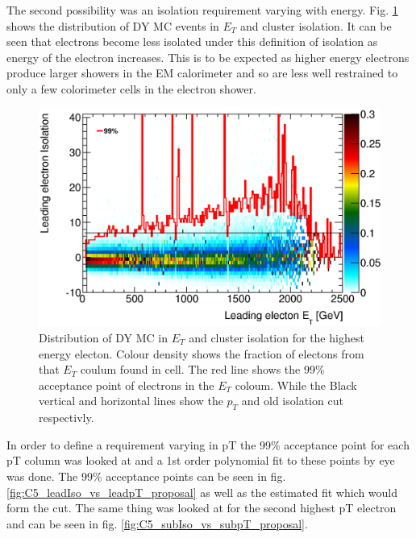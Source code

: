 The second possibility was an isolation requirement varying with energy. Fig. \ref{fig:C5_leadIso_vs_leadpT} shows the distribution of DY MC events in $E_{T}$ and cluster isolation. It can be seen that electrons become less isolated under this definition of isolation as energy of the electron increases. This is to be expected as higher energy electrons produce larger showers in the EM calorimeter and so are less well restrained to only a few colorimeter cells in the electron shower. 

   \begin{figure}[h]
      \begin{center}
      \includegraphics[scale=0.7]{images/C5_leadIso_vs_leadpT.eps}
      \end{center}
   \caption{Distribution of DY MC in $E_{T}$ and cluster isolation for the highest energy electon. Colour density shows the fraction of electons from that $E_{T}$ coulum found in cell. The red line shows the 99\% acceptance point of electrons in the $E_{T}$ coloum. While the Black vertical and horizontal lines show the $p_{T}$ and old isolation cut respectivly.}
   \label{fig:C5_leadIso_vs_leadpT}
   \end{figure}


In order to define a requirement varying in pT the 99\% acceptance point for each pT column was looked at and a 1st order polynomial fit to these points by eye was done. The 99\% acceptance points can be seen in fig. \ref{fig:C5_leadIso_vs_leadpT_proposal} as well as the estimated fit which would form the cut. The same thing was looked at for the second highest pT electron and can be seen in fig. \ref{fig:C5_subIso_vs_subpT_proposal}.


